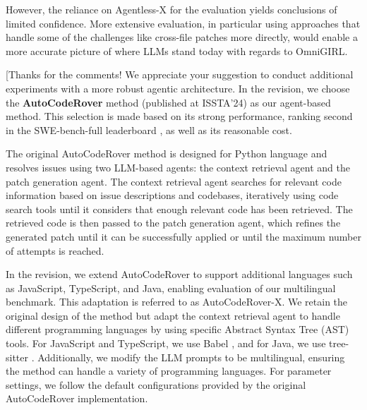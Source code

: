 \documentclass[12pt,american]{article}
\begin{document}
\begin{revcomment}
However, the reliance on Agentless-X for the evaluation yields conclusions of limited confidence. More extensive evaluation, in particular using approaches that handle some of the challenges like cross-file patches more directly, would enable a more accurate picture of where LLMs stand today with regards to OmniGIRL.
\end{revcomment}
\begin{revresponse}[Thanks for the comments! We appreciate your suggestion to conduct additional experiments with a more robust agentic architecture. In the revision, we choose the \textbf{AutoCodeRover} \text{[Ref6]} method (published at ISSTA'24) as our agent-based method. This selection is made based on its strong performance, ranking second in the SWE-bench-full leaderboard \text{[Ref4]}, as well as its reasonable cost. 

The original AutoCodeRover method is designed for Python language and resolves issues using two LLM-based agents: the context retrieval agent and the patch generation agent. The context retrieval agent searches for relevant code information based on issue descriptions and codebases, iteratively using code search tools until it considers that enough relevant code has been retrieved. The retrieved code is then passed to the patch generation agent, which refines the generated patch until it can be successfully applied or until the maximum number of attempts is reached.

In the revision, we extend AutoCodeRover to support additional languages such as JavaScript, TypeScript, and Java, enabling evaluation of our multilingual benchmark. This adaptation is referred to as AutoCodeRover-X. We retain the original design of the method but adapt the context retrieval agent to handle different programming languages by using specific Abstract Syntax Tree (AST) tools. For JavaScript and TypeScript, we use Babel \text{[Ref7]}, and for Java, we use tree-sitter \text{[Ref8]}. Additionally, we modify the LLM prompts to be multilingual, ensuring the method can handle a variety of programming languages. For parameter settings, we follow the default configurations provided by the original AutoCodeRover implementation.


\end{revresponse}
\end{document}

